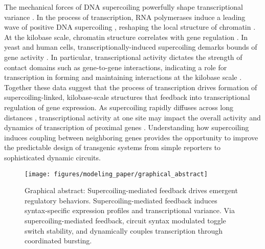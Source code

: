 \documentclass[11pt]{article}
\begin{document}
The mechanical forces of DNA supercoiling powerfully shape transcriptional variance \parencite{desaiDNArepairPathwayCan2021,chongMechanismTranscriptionalBursting2014}.
In the process of transcription, RNA polymerases induce a leading wave of positive DNA supercoiling \parencite{wuTranscriptionGeneratesPositively1988,liuSupercoilingDNATemplate1987}, reshaping the local structure of chromatin \parencite{acharNegativeSupercoilGene2020,tevesTranscriptiongeneratedTorsionalStress2014,naughtonTranscriptionFormsRemodels2013,guoHighresolutionGenomewideMapping2021}.
At the kilobase scale, chromatin structure correlates with gene regulation \parencite{hsiehResolving3DLandscape2020,rowleyEvolutionarilyConservedPrinciples2017, krietensteinUltrastructuralDetailsMammalian2020}.
In yeast and human cells, transcriptionally-induced supercoiling demarks bounds of gene activity \parencite{acharNegativeSupercoilGene2020,naughtonTranscriptionFormsRemodels2013,kouzineTranscriptiondependentDynamicSupercoiling2013}.
In particular, transcriptional activity dictates the strength of contact domains such as gene-to-gene interactions, indicating a role for transcription in forming and maintaining interactions at the kilobase scale \parencite{rowleyOrganizationalPrinciples3D2018,rowleyEvolutionarilyConservedPrinciples2017}.
Together these data suggest that the process of transcription drives formation of supercoiling-linked, kilobase-scale structures that feedback into transcriptional regulation of gene expression.
As supercoiling rapidly diffuses across long distances \parencite{loenhoutDynamicsDNASupercoils2012}, transcriptional activity at one site may impact the overall activity and dynamics of transcription of proximal genes \parencite{sevierPropertiesGeneExpression2018, sevierCollectivePolymeraseDynamics2022,tripathiDNASupercoilingmediatedCollective2021}.
Understanding how supercoiling induces coupling between neighboring genes provides the opportunity to improve the predictable design of transgenic systems from simple reporters to sophisticated dynamic circuits.

\begin{figure}[h]
    \centering
    \texttt{[image: figures/modeling\_paper/graphical\_abstract]}
    \caption{Graphical abstract: Supercoiling-mediated feedback drives emergent regulatory behaviors. Supercoiling-mediated feedback induces syntax-specific expression profiles and transcriptional variance. Via supercoiling-mediated feedback, circuit syntax modulated toggle switch stability, and dynamically couples transcription through coordinated bursting. } \label{fig:graphical_abstract}
\end{figure}
\end{document}
